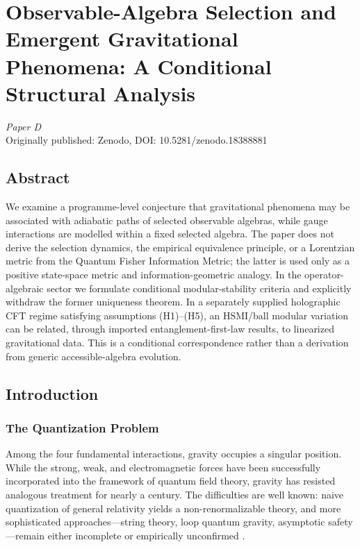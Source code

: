 \documentclass[12pt,a4paper,openany]{book}
\begin{document}
\chapter{Observable-Algebra Selection and Emergent Gravitational Phenomena: A Conditional Structural Analysis}
\label{chap:paperD}

\begin{center}
\textit{Paper D}\\[0.5em]
Originally published: Zenodo, DOI: 10.5281/zenodo.18388881
\end{center}

\bigskip

\section*{Abstract}
We examine a programme-level conjecture that gravitational phenomena may be associated with adiabatic paths of selected observable algebras, while gauge interactions are modelled within a fixed selected algebra.  The paper does not derive the selection dynamics, the empirical equivalence principle, or a Lorentzian metric from the Quantum Fisher Information Metric; the latter is used only as a positive state-space metric and information-geometric analogy.
In the operator-algebraic sector we formulate conditional modular-stability criteria and explicitly withdraw the former uniqueness theorem.  In a separately supplied holographic CFT regime satisfying assumptions (H1)--(H5), an HSMI/ball modular variation can be related, through imported entanglement-first-law results, to linearized gravitational data.  This is a conditional correspondence rather than a derivation from generic accessible-algebra evolution.


\section{Introduction}
\label{D-sec:intro}

\subsection{The Quantization Problem}

Among the four fundamental interactions, gravity occupies a singular position. While the strong, weak, and electromagnetic forces have been successfully incorporated into the framework of quantum field theory, gravity has resisted analogous treatment for nearly a century. The difficulties are well known: naive quantization of general relativity yields a non-renormalizable theory, and more sophisticated approaches—string theory, loop quantum gravity, asymptotic safety—remain either incomplete or empirically unconfirmed \cite{Kiefer2012}.
\end{document}
